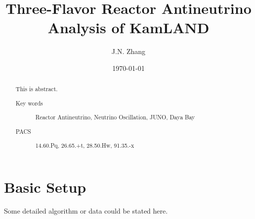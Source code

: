\documentclass[%
 reprint,
 amsmath,amssymb,
 aps,
]{revtex4-1}
\begin{document}

\title{Three-Flavor Reactor Antineutrino Analysis of KamLAND}%


\author{J.N. Zhang}
%



\date{\today}%

\begin{abstract}
This is abstract.

\begin{description}
\item[Key words]
Reactor Antineutrino, Neutrino Oscillation, JUNO, Daya Bay
\item[PACS]
14.60.Pq, 26.65.+t, 28.50.Hw, 91.35.-x

\end{description}
\end{abstract}

\maketitle


\section{\label{sec:Setup} Basic Setup}
Some detailed algorithm or data could be stated here.
\end{document}
